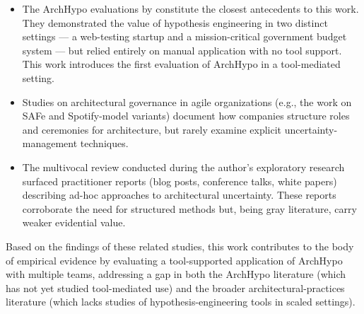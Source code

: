 \begin{itemize}
  \item The ArchHypo evaluations by \citet{silva2024tse,silva2024ieeesw}
  constitute the closest antecedents to this work. They demonstrated the value of
  hypothesis engineering in two distinct settings --- a web-testing startup and a
  mission-critical government budget system --- but relied entirely on manual application
  with no tool support. This work introduces the first evaluation of ArchHypo in a
  tool-mediated setting.

  \item Studies on architectural governance in agile organizations (e.g., the work on
  SAFe and Spotify-model variants) document how companies structure roles and
  ceremonies for architecture, but rarely examine explicit uncertainty-management
  techniques.

  \item The multivocal review conducted during the author's exploratory research surfaced
  practitioner reports (blog posts, conference talks, white papers) describing ad-hoc
  approaches to architectural uncertainty. These reports corroborate the need for
  structured methods but, being gray literature, carry weaker evidential value.
\end{itemize}

Based on the findings of these related studies, this work contributes to the body of empirical evidence by evaluating a
tool-supported application of ArchHypo with multiple teams, addressing a gap in both the ArchHypo literature (which has not yet studied tool-mediated use) and the broader
architectural-practices literature (which lacks studies of hypothesis-engineering tools in scaled settings).

